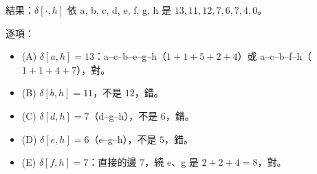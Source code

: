 \begin{pastsoln}
結果：$\delta[\cdot, h]$ 依 a, b, c, d, e, f, g, h 是 $13, 11, 12, 7, 6, 7, 4, 0$。

逐項：
\begin{itemize}
\item (A) $\delta[a,h] = 13$：a--c--b--e--g--h（$1 + 1 + 5 + 2 + 4$）或 a--c--b--f--h（$1 + 1 + 4 + 7$），對。
\item (B) $\delta[b,h] = 11$，不是 $12$，錯。
\item (C) $\delta[d,h] = 7$（d--g--h），不是 $6$，錯。
\item (D) $\delta[e,h] = 6$（e--g--h），不是 $5$，錯。
\item (E) $\delta[f,h] = 7$：直接的邊 $7$，繞 e、g 是 $2 + 2 + 4 = 8$，對。
\end{itemize}
\end{pastsoln}
